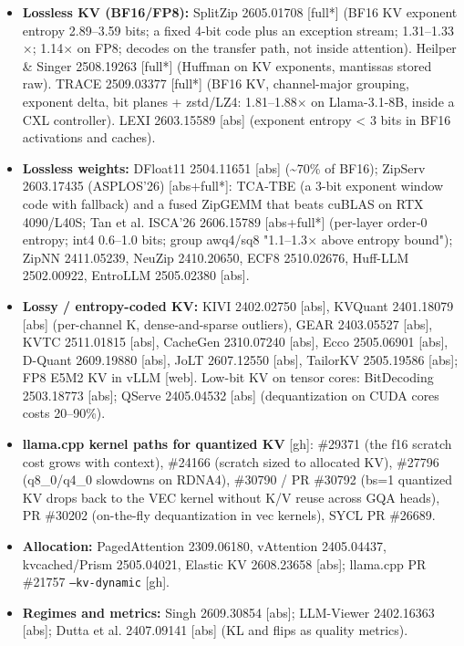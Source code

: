\documentclass[10pt]{article}
\begin{document}
\begin{itemize}
\item \textbf{Lossless KV (BF16/FP8):} SplitZip 2605.01708 [full*] (BF16 KV exponent entropy 2.89--3.59 bits; a fixed 4-bit code plus an exception stream; 1.31--1.33$\times$; 1.14$\times$ on FP8; decodes on the transfer path, not inside attention). Heilper \& Singer 2508.19263 [full*] (Huffman on KV exponents, mantissas stored raw). TRACE 2509.03377 [full*] (BF16 KV, channel-major grouping, exponent delta, bit planes + zstd/LZ4: 1.81--1.88$\times$ on Llama-3.1-8B, inside a CXL controller). LEXI 2603.15589 [abs] (exponent entropy < 3 bits in BF16 activations and caches).
\item \textbf{Lossless weights:} DFloat11 2504.11651 [abs] (\textasciitilde{}70\% of BF16); ZipServ 2603.17435 (ASPLOS'26) [abs+full*]: TCA-TBE (a 3-bit exponent window code with fallback) and a fused ZipGEMM that beats cuBLAS on RTX 4090/L40S; Tan et al. ISCA'26 2606.15789 [abs+full*] (per-layer order-0 entropy; int4 0.6--1.0 bits; group awq4/sq8 "1.1--1.3$\times$ above entropy bound"); ZipNN 2411.05239, NeuZip 2410.20650, ECF8 2510.02676, Huff-LLM 2502.00922, EntroLLM 2505.02380 [abs].
\item \textbf{Lossy / entropy-coded KV:} KIVI 2402.02750 [abs], KVQuant 2401.18079 [abs] (per-channel K, dense-and-sparse outliers), GEAR 2403.05527 [abs], KVTC 2511.01815 [abs], CacheGen 2310.07240 [abs], Ecco 2505.06901 [abs], D-Quant 2609.19880 [abs], JoLT 2607.12550 [abs], TailorKV 2505.19586 [abs]; FP8 E5M2 KV in vLLM [web]. Low-bit KV on tensor cores: BitDecoding 2503.18773 [abs]; QServe 2405.04532 [abs] (dequantization on CUDA cores costs 20--90\%).
\item \textbf{llama.cpp kernel paths for quantized KV} [gh]: \#29371 (the f16 scratch cost grows with context), \#24166 (scratch sized to allocated KV), \#27796 (q8\_0/q4\_0 slowdowns on RDNA4), \#30790 / PR \#30792 (bs=1 quantized KV drops back to the VEC kernel without K/V reuse across GQA heads), PR \#30202 (on-the-fly dequantization in vec kernels), SYCL PR \#26689.
\item \textbf{Allocation:} PagedAttention 2309.06180, vAttention 2405.04437, kvcached/Prism 2505.04021, Elastic KV 2608.23658 [abs]; llama.cpp PR \#21757 \texttt{--kv-dynamic} [gh].
\item \textbf{Regimes and metrics:} Singh 2609.30854 [abs]; LLM-Viewer 2402.16363 [abs]; Dutta et al. 2407.09141 [abs] (KL and flips as quality metrics).
\end{itemize}
\end{document}
